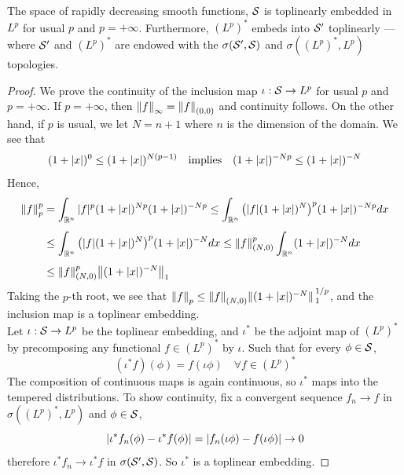 \documentclass[../main-v2-manifolds.tex]{subfiles}
\begin{document}
\begin{lemma}\label{lem:szz toplinearly embedded for p geq 1}
    The space of rapidly decreasing smooth functions, $\mathcal{S}$ is toplinearly embedded in $L^p$ for usual $p$ and $p = +\infty$. Furthermore, $(L^p)^*$ embeds into $\mathcal{S}'$ toplinearly --- where $\mathcal{S}'$ and $(L^p)^*$ are endowed with the $\sigma(\mathcal{S}',\mathcal{S})$ and $\sigma((L^p)^*, L^p)$ topologies.
\end{lemma}
\begin{proof}
    We prove the continuity of the inclusion map $\iota:\mathcal{S}\to L^p$ for usual $p$ and $p=+\infty$. If $p = +\infty$, then $\norm{f}_{\infty}=\norm{f}_{(0,0)}$ and continuity follows. On the other hand, if $p$ is usual, we let $N = n+1$ where $n$ is the dimension of the domain. We see that
    \[
        (1+\abs{x})^0\leq (1+\abs{x})^{N(p-1)}\qqtext{implies} (1+\abs{x})^{-Np}\leq (1+\abs{x})^{-N}
    \]
    Hence, 
    \begin{align*}
    \norm{f}_{p}^{p} &= \int_{{\mathbb{R}^n}}\vert {f} \vert^{p} (1+\vert {x} \vert)^{Np}(1+\vert {x} \vert)^{-Np}\leq \int_{{\mathbb{R}^n}} \qty(\vert {f} \vert (1+\vert {x} \vert )^N)^p (1+\vert {x} \vert )^{-Np}dx \\[1ex]
    &\leq \int_{{\mathbb{R}^n}} \qty(\vert {f} \vert (1+\vert {x} \vert )^N)^p (1+\vert {x} \vert )^{-N}dx\leq \norm{f}_{(N,0)}^{p}\int_{{\mathbb{R}^n}}(1+\vert {x} \vert)^{-N}dx\\[1ex]
    &\leq \norm{f}_{(N,0)}^{p}\norm{(1+\vert {x} \vert)^{-N}}_{1}
    \end{align*}
    Taking the $p$-th root, we see that $\norm{f}_{p}\leq\norm{f}_{(N,0)}\norm*{(1+\vert {x} \vert)^{-N}}_{1}^{1/p}$, and the inclusion map is a toplinear embedding. \\
    
    Let $\iota: \mathcal{S}\to L^p$ be the toplinear embedding, and $\iota^*$ be the adjoint map of $(L^p)^*$ by precomposing any functional $f\in (L^p)^*$ by $\iota$. Such that for every $\phi\in\mathcal{S}$,
    \[
    (\iota^*f)(\phi) = f(\iota\phi)\quad\forall f\in (L^p)^*
    \]
    The composition of continuous maps is again continuous, so $\iota^*$ maps into the tempered distributions. To show continuity, fix a convergent sequence $f_n\to f$ in $\sigma((L^p)^*, L^p)$ and $\phi\in\mathcal{S}$,
    \[
    \vert {\iota^* f_n(\phi) - \iota^* f(\phi)} \vert = \vert {f_n(\iota\phi) - f(\iota\phi)} \vert\to 0
    \]
    therefore $\iota^*f_n\to \iota^*f$ in $\sigma(\mathcal{S}', \mathcal{S})$. So $\iota^*$ is a toplinear embedding. 
\end{proof}
\end{document}
